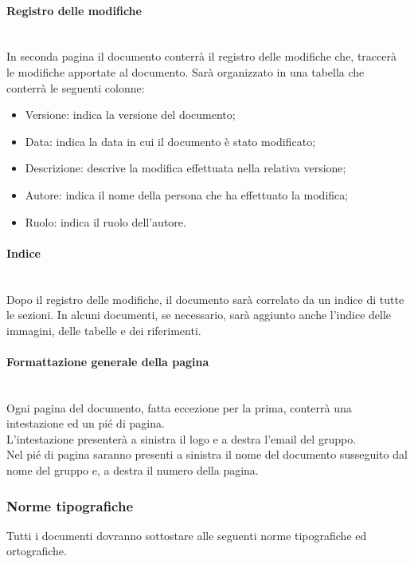 	\paragraph{Registro delle modifiche}
	~\\In seconda pagina il documento conterrà il registro delle modifiche che, traccerà le modifiche apportate al documento. Sarà organizzato in una tabella che conterrà le seguenti colonne:
	\begin{itemize}
		\item Versione:
		indica la versione del documento;
		\item Data:
		indica la data in cui il documento è stato modificato;
		\item Descrizione:
		descrive la modifica effettuata nella relativa versione;
		\item Autore:
		indica il nome della persona che ha effettuato la modifica;
		\item Ruolo:
		indica il ruolo dell'autore.
	\end{itemize}
	\paragraph{Indice}
	~\\Dopo il registro delle modifiche, il documento sarà correlato da un indice di tutte le sezioni. In alcuni documenti, se necessario, sarà aggiunto anche l'indice delle immagini, delle tabelle e dei riferimenti.
	\paragraph{Formattazione generale della pagina}
	~\\Ogni pagina del documento, fatta eccezione per la prima, conterrà una intestazione ed un pié di pagina.
	\\L'intestazione presenterà a sinistra il logo e a destra l'email del gruppo.
	\\Nel pié di pagina saranno presenti a sinistra il nome del documento susseguito dal nome del gruppo e, a destra il numero della pagina.
	\subsubsection{Norme tipografiche}
	Tutti i documenti dovranno sottostare alle seguenti norme tipografiche ed ortografiche.
